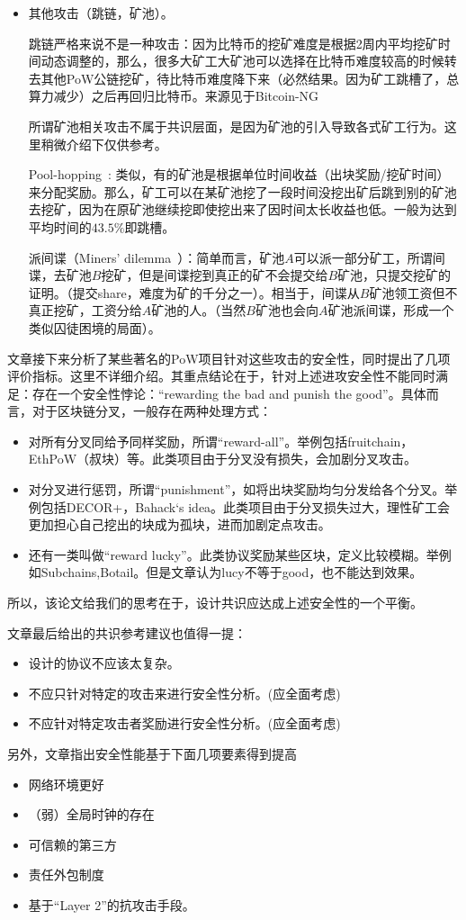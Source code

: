 \begin{itemize}
	\item 其他攻击（跳链，矿池）。
	
	跳链严格来说不是一种攻击：因为比特币的挖矿难度是根据2周内平均挖矿时间动态调整的，那么，很多大矿工大矿池可以选择在比特币难度较高的时候转去其他PoW公链挖矿，待比特币难度降下来（必然结果。因为矿工跳槽了，总算力减少）之后再回归比特币。来源见于Bitcoin-NG~\cite{eyal2016bitcoin}
		
	所谓矿池相关攻击不属于共识层面，是因为矿池的引入导致各式矿工行为。这里稍微介绍下仅供参考。
	
	Pool-hopping~\cite{rosenfeld2011analysis}: 类似，有的矿池是根据单位时间收益（出块奖励/挖矿时间）来分配奖励。那么，矿工可以在某矿池挖了一段时间没挖出矿后跳到别的矿池去挖矿，因为在原矿池继续挖即使挖出来了因时间太长收益也低。一般为达到平均时间的$43.5\%$即跳槽。
	
	派间谍（Miners' dilemma~\cite{eyal2015miner}）：简单而言，矿池$A$可以派一部分矿工，所谓间谍，去矿池$B$挖矿，但是间谍挖到真正的矿不会提交给$B$矿池，只提交挖矿的证明。（提交share，难度为矿的千分之一）。相当于，间谍从$B$矿池领工资但不真正挖矿，工资分给$A$矿池的人。（当然$B$矿池也会向$A$矿池派间谍，形成一个类似囚徒困境的局面）。
\end{itemize}

文章接下来分析了某些著名的PoW项目针对这些攻击的安全性，同时提出了几项评价指标。这里不详细介绍。其重点结论在于，针对上述进攻安全性不能同时满足：存在一个安全性悖论：“rewarding the bad and punish the good”。具体而言，对于区块链分叉，一般存在两种处理方式：

\begin{itemize}
	\item 对所有分叉同给予同样奖励，所谓“reward-all”。举例包括fruitchain，EthPoW（叔块）等。此类项目由于分叉没有损失，会加剧分叉攻击。
	
	\item 对分叉进行惩罚，所谓“punishment”，如将出块奖励均匀分发给各个分叉。举例包括DECOR+，Bahack‘s idea。此类项目由于分叉损失过大，理性矿工会更加担心自己挖出的块成为孤块，进而加剧定点攻击。
	
	\item 还有一类叫做“reward lucky”。此类协议奖励某些区块，定义比较模糊。举例如Subchains,Botail。但是文章认为lucy不等于good，也不能达到效果。
\end{itemize}

所以，该论文给我们的思考在于，设计共识应达成上述安全性的一个平衡。

文章最后给出的共识参考建议也值得一提：
\begin{itemize}
	\item 设计的协议不应该太复杂。
	\item 不应只针对特定的攻击来进行安全性分析。(应全面考虑)
	\item 不应针对特定攻击者奖励进行安全性分析。(应全面考虑)
\end{itemize}
另外，文章指出安全性能基于下面几项要素得到提高
\begin{itemize}
	\item 网络环境更好
	\item （弱）全局时钟的存在
	\item 可信赖的第三方
	\item 责任外包制度
	\item 基于“Layer 2”的抗攻击手段。
\end{itemize}

